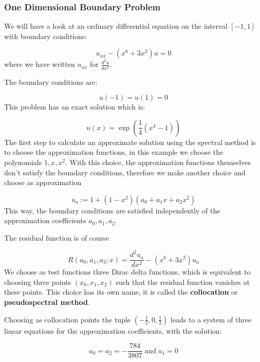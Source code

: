 \documentclass[preprint, 5p, 10pt]{elsarticle}
\theoremstyle{plain}
\begin{document}
\subsubsection{One Dimensional Boundary Problem}

We will have a look at an ordinary differential equation on the interval $[-1, 1]$ with boundary conditions:

\begin{displaymath}
u_{xx} - (x^6 + 3 x^2) u = 0
\end{displaymath}
where we have written $u_{xx}$ for $\frac{d^2 u}{d x^2}$.

The boundary conditions are:

\begin{displaymath}
u(-1) = u(1) = 0
\end{displaymath}
This problem has an exact solution which is:

\begin{displaymath}
u(x) = \exp{(\frac{1}{4} (x^4 - 1))}
\end{displaymath}
The first step to calculate an approximate solution using the spectral method is to choose the approximation functions, in this example we choose the polynomials $1, x, x^2$. With this choice, the approximation functions themselves don'{}t satisfy the boundary conditions, therefore we make another choice and choose as approximation

\begin{displaymath}
u_a := 1 + (1 - x^2) (a_0 + a_1 x + a_2 x^2)
\end{displaymath}
This way, the boundary conditions are satisfied independently of the approximation coefficients $a_0, a_1, a_2$.

The residual function is of course

\begin{displaymath}
R(a_0, a_1, a_3; x) = \frac{d^2 u_a}{d x^2} - (x^6 + 3 x^2) u_a
\end{displaymath}
We choose as test functions three Dirac delta functions, which is equivalent to choosing three points $(x_0, x_1, x_2)$ such that the residual function vanishes at these points. This choice has its own name, it is called the \textbf{collocation} or \textbf{pseudospectral method}.

Choosing as collocation points the tuple $(- \frac{1}{2}, 0, \frac{1}{2})$ leads to a system of three linear equations for the approximation coefficients, with the solution:

\begin{displaymath}
a_0 = a_2 = - \frac{784}{3807} \; \text{and} \; a_1 = 0
\end{displaymath}
\end{document}

